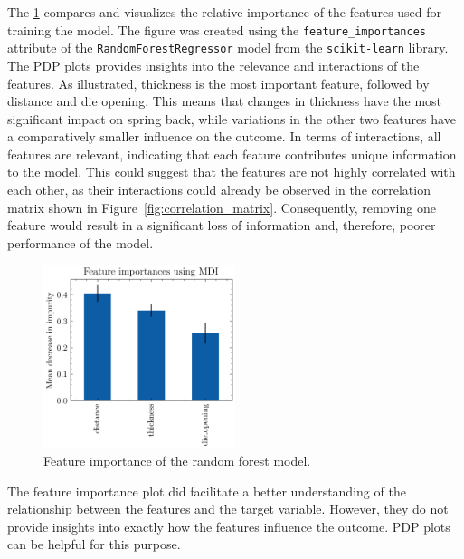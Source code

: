 The \cref{fig:feature-importances-rf1} compares and visualizes the relative importance of the features used for
training the model.
The figure was created using the \texttt{feature\_importances} attribute of the \texttt{RandomForestRegressor}
model from the \texttt{scikit-learn} library.
The PDP plots provides insights into the relevance and interactions of the
features.
As illustrated, thickness is the most important feature, followed by distance and die opening.
This means that changes in thickness have the most significant impact on spring back, while variations in the other
two features
have a comparatively smaller influence on the outcome.
In terms of interactions, all features are relevant, indicating that each feature contributes unique information to
the model.
This could suggest that the features are not highly correlated with each other, as their interactions
could already be observed in the correlation matrix shown in Figure~\ref{fig:correlation_matrix}.
Consequently, removing one feature would result in a significant loss of information and, therefore, poorer
performance of the model.

\begin{figure}[h]
    \begin{tcolorbox}[arc=0pt,boxrule=0.5pt]
        \centering
        \includegraphics[width=0.5\textwidth]{chap5/images/rf_feature_importances}
    \end{tcolorbox}
    \caption{Feature importance of the random forest model.}
    \label{fig:feature-importances-rf1}
\end{figure}

The feature importance plot did facilitate a better understanding of the relationship between the features and the
target
variable.
However, they do not provide insights into exactly how the features influence the outcome.
PDP plots can be helpful for this purpose.

